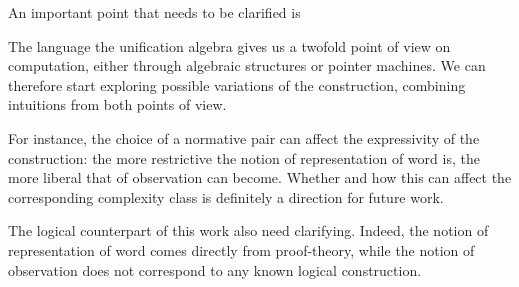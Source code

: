 

\smallskip

An important point that needs to be clarified is 










\smallskip
The language the unification algebra gives us a twofold point of view on computation, either through algebraic structures or pointer machines. We can therefore start exploring possible variations of the construction, combining intuitions from both points of view.


\smallskip
For instance, the choice of a normative pair can affect the expressivity of the construction:
the more restrictive the notion of representation of word is, the more liberal that of observation can become.
Whether and how this can affect the corresponding complexity class is definitely a direction for future work.

\smallskip
The logical counterpart of this work also need clarifying. Indeed, the notion of representation of word comes directly from proof-theory, while the notion of observation does not correspond to any known logical construction.
